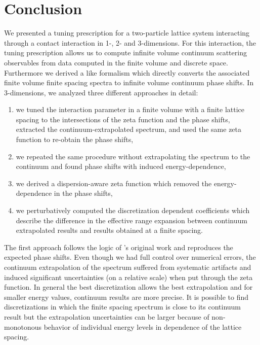 \section{Conclusion}\label{sec:conclusion}

We presented a tuning prescription for a two-particle lattice system interacting through a contact interaction in 1-, 2- and 3-dimensions.
For this interaction, the tuning prescription allows us to compute infinite volume continuum scattering observables %
from data computed in the finite volume and discrete space.
Furthermore we derived a \Luscher like formalism which directly converts the associated finite volume finite spacing spectra to infinite volume continuum phase shifts.
In 3-dimensions, we analyzed three different approaches in detail:
\begin{enumerate}
	\item we tuned the interaction parameter in a finite volume with a finite lattice spacing to the intersections of the \Luscher zeta function and the phase shifts, extracted the continuum-extrapolated spectrum, and used the same \Luscher zeta function to re-obtain the phase shifts,
	\item we repeated the same procedure without extrapolating the spectrum to the continuum and found phase shifts with induced energy-dependence,
	\item we derived a dispersion-aware zeta function which removed the energy-dependence in the phase shifts,
	\item we perturbatively computed the discretization dependent coefficients which describe the difference in the effective range expansion between continuum extrapolated results and results obtained at a finite spacing.
\end{enumerate}

The first approach follows the logic of \Luscher's original work and reproduces the expected phase shifts.
Even though we had full control over numerical errors, the continuum extrapolation of the spectrum suffered from systematic artifacts and induced significant uncertainties (on a relative scale) when put through the zeta function.
In general the best discretization allows the best extrapolation and for smaller energy values, continuum results are more precise.
It is possible to find discretizations in which the finite spacing spectrum is close to its continuum result but the extrapolation uncertainties can be larger because of non-monotonous behavior of individual energy levels in dependence of the lattice spacing.

